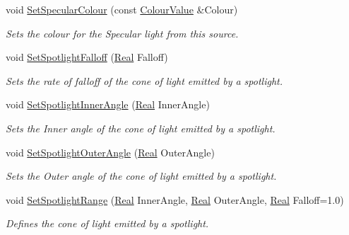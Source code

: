 \begin{DoxyCompactItemize}
void \hyperlink{classphys_1_1Light_a158a24f8f46b4fb86f483267730f22d7}{SetSpecularColour} (const \hyperlink{classphys_1_1ColourValue}{ColourValue} \&Colour)
\begin{DoxyCompactList}\small\item\em Sets the colour for the Specular light from this source. \item\end{DoxyCompactList}\item 
void \hyperlink{classphys_1_1Light_a170e0fc23e3a50587a483fa8981b5486}{SetSpotlightFalloff} (\hyperlink{namespacephys_af7eb897198d265b8e868f45240230d5f}{Real} Falloff)
\begin{DoxyCompactList}\small\item\em Sets the rate of falloff of the cone of light emitted by a spotlight. \item\end{DoxyCompactList}\item 
void \hyperlink{classphys_1_1Light_a3b812a0181d08f3c30c9a75f13fd6282}{SetSpotlightInnerAngle} (\hyperlink{namespacephys_af7eb897198d265b8e868f45240230d5f}{Real} InnerAngle)
\begin{DoxyCompactList}\small\item\em Sets the Inner angle of the cone of light emitted by a spotlight. \item\end{DoxyCompactList}\item 
void \hyperlink{classphys_1_1Light_a6cab679dfc15d35e3d3b8b229e602fff}{SetSpotlightOuterAngle} (\hyperlink{namespacephys_af7eb897198d265b8e868f45240230d5f}{Real} OuterAngle)
\begin{DoxyCompactList}\small\item\em Sets the Outer angle of the cone of light emitted by a spotlight. \item\end{DoxyCompactList}\item 
void \hyperlink{classphys_1_1Light_a25c79247a42b49d04825bbc76977a134}{SetSpotlightRange} (\hyperlink{namespacephys_af7eb897198d265b8e868f45240230d5f}{Real} InnerAngle, \hyperlink{namespacephys_af7eb897198d265b8e868f45240230d5f}{Real} OuterAngle, \hyperlink{namespacephys_af7eb897198d265b8e868f45240230d5f}{Real} Falloff=1.0)
\begin{DoxyCompactList}\small\item\em Defines the cone of light emitted by a spotlight. \item\end{DoxyCompactList}\item 

\end{DoxyCompactItemize}
